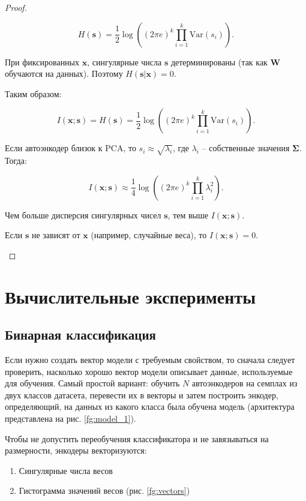 \documentclass[a4paper, 14pt]{article}
\begin{document}
\begin{proof}
\begin{enumerate}
\[H(\mathbf{s}) = \frac{1}{2} \log \left( (2\pi e)^k \prod_{i=1}^k \text{Var}(s_i) \right).\]

При фиксированных $\mathbf{x}$, сингулярные числа $\mathbf{s}$ детерминированы (так как $\mathbf{W}$ обучаются на данных). Поэтому $H(\mathbf{s} | \mathbf{x}) = 0$.

Таким образом:

\[I(\mathbf{x}; \mathbf{s}) = H(\mathbf{s}) = \frac{1}{2} \log \left( (2\pi e)^k \prod_{i=1}^k \text{Var}(s_i) \right).\]

Если автоэнкодер близок к PCA, то $s_i \approx \sqrt{\lambda_i}$, где $\lambda_i$ -- собственные значения $\boldsymbol{\Sigma}$. Тогда:

\[I(\mathbf{x}; \mathbf{s}) \approx \frac{1}{4} \log \left( (2\pi e)^k \prod_{i=1}^k \lambda_i^2 \right).\]

Чем больше дисперсия сингулярных чисел $\mathbf{s}$, тем выше $I(\mathbf{x}; \mathbf{s})$.

Если $\mathbf{s}$ не зависят от $\mathbf{x}$ (например, случайные веса), то $I(\mathbf{x}; \mathbf{s}) = 0$.
\end{enumerate}
\end{proof}

\section{Вычислительные эксперименты}
\subsection{Бинарная классификация}

Если нужно создать вектор модели с требуемым свойством, то сначала следует проверить, насколько хорошо вектор модели описывает данные, используемые для обучения. Самый простой вариант: обучить $N$ автоэнкодеров на семплах из двух классов датасета, перевести их в векторы и затем построить энкодер, определяющий, на данных из какого класса была обучена модель (архитектура представлена на рис. \ref{fg:model_1}).

Чтобы не допустить переобучения классификатора и не завязываться на размерности, энкодеры векторизуются:

\begin{enumerate}
    \item Сингулярные числа весов
    \item Гистограмма значений весов (рис. \ref{fg:vectors})
\end{enumerate}
\end{document}
